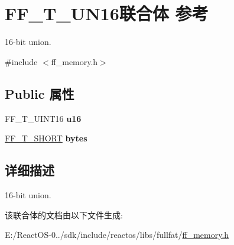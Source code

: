 \hypertarget{union_f_f___t___u_n16}{}\section{F\+F\+\_\+\+T\+\_\+\+U\+N16联合体 参考}
\label{union_f_f___t___u_n16}


16-\/bit union.  




{\ttfamily \#include $<$ff\+\_\+memory.\+h$>$}

\subsection*{Public 属性}
\begin{DoxyCompactItemize}
\item 
\mbox{\label{union_f_f___t___u_n16_a8935361d5515ee3ff524a4bf9cee1b4c}} 
F\+F\+\_\+\+T\+\_\+\+U\+I\+N\+T16 {\bfseries u16}
\item 
\mbox{\label{union_f_f___t___u_n16_a3f080d49ad560876ec76bff8663e9038}} 
\hyperlink{struct_f_f___t___s_h_o_r_t}{F\+F\+\_\+\+T\+\_\+\+S\+H\+O\+RT} {\bfseries bytes}
\end{DoxyCompactItemize}


\subsection{详细描述}
16-\/bit union. 

该联合体的文档由以下文件生成\+:\begin{DoxyCompactItemize}
\item 
E\+:/\+React\+O\+S-\/0../sdk/include/reactos/libs/fullfat/\hyperlink{ff__memory_8h}{ff\+\_\+memory.\+h}\end{DoxyCompactItemize}
